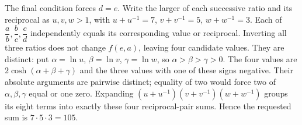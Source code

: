 The final condition forces $d=e$. Write the larger of each successive ratio and its reciprocal as $u,v,w>1$, with $u+u^{-1}=7$, $v+v^{-1}=5$, $w+w^{-1}=3$. Each of $\dfrac{a}{b},\dfrac{b}{c},\dfrac{c}{d}$ independently equals its corresponding value or reciprocal. Inverting all three ratios does not change $f(e,a)$, leaving four candidate values. They are distinct: put $\alpha=\ln u$, $\beta=\ln v$, $\gamma=\ln w$, so $\alpha>\beta>\gamma>0$. The four values are $2\cosh(\alpha+\beta+\gamma)$ and the three values with one of these signs negative. Their absolute arguments are pairwise distinct; equality of two would force two of $\alpha,\beta,\gamma$ equal or one zero. Expanding $(u+u^{-1})(v+v^{-1})(w+w^{-1})$ groups its eight terms into exactly these four reciprocal-pair sums. Hence the requested sum is $7\cdot5\cdot3=\boxed{105}$.
